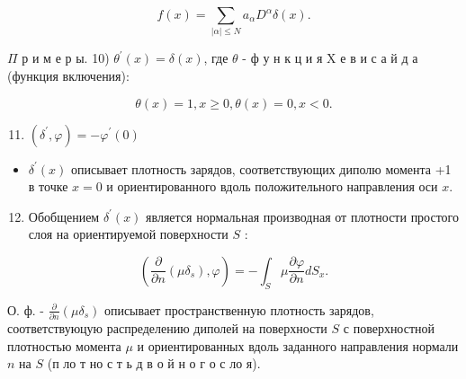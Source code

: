 \documentclass[10pt]{article}
\begin{document}
\[

f(x)=\sum_{|\alpha| \leqslant N} a_{\alpha} D^{\alpha} \delta(x) .

\]



$\Pi$ р и м е р ы. 10) $\theta^{\prime}(x)=\delta(x)$, где $\theta$ - ф у н к ц и я $\mathrm{X}$ е в и с а й д а (функция включения):



\[

\theta(x)=1, x \geqslant 0, \theta(x)=0, x<0 .

\]



\begin{enumerate}

  \setcounter{enumi}{10}

  \item $\left(\delta^{\prime}, \varphi\right)=-\varphi^{\prime}(0)$

\end{enumerate}



\begin{itemize}

  \item $\delta^{\prime}(x)$ описывает плотность зарядов, соответствующих диполю момента +1 в точке $x=0$ и ориентированного вдоль положительного направления оси $x$.

\end{itemize}



\begin{enumerate}

  \setcounter{enumi}{11}

  \item Обобщением $\delta^{\prime}(x)$ является нормальная производная от плотности простого слоя на ориентируемой поверхности $S$ :

\end{enumerate}



\[

\left(\frac{\partial}{\partial n}\left(\mu \delta_{s}\right), \varphi\right)=-\int_{S} \mu \frac{\partial \varphi}{\partial n} d S_{x} .

\]



О. ф. - $\frac{\partial}{\partial n}\left(\mu \delta_{s}\right)$ описывает пространственную плотность зарядов, соответствуюцую распределению диполей на поверхности $S$ с поверхностной плотностью момента $\mu$ и ориентированных вдоль заданного направления нормали $n$ на $S$ (п ло т но с т ь д в о й н о г о с ло я).
\end{document}
